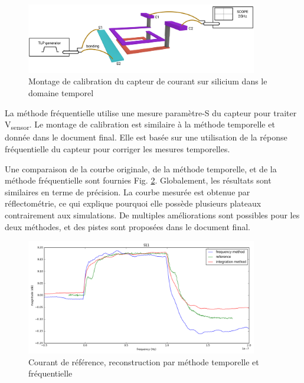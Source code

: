 \begin{figure}[!h]
  \centering
  \includegraphics[width=0.9\textwidth]{src/1/figures/sensor_measurement_setup.pdf}
  \caption{Montage de calibration du capteur de courant sur silicium dans le domaine temporel}
  \label{fig:calibration-sensor}
\end{figure}

La méthode fréquentielle utilise une mesure paramètre-S du capteur pour traiter V\textsubscript{sensor}.
Le montage de calibration est similaire à la méthode temporelle et donnée dans le document final.
Elle est basée sur une utilisation de la réponse fréquentielle du capteur pour corriger les mesures temporelles.

Une comparaison de la courbe originale, de la méthode temporelle, et de la méthode fréquentielle sont fournies Fig. \ref{fig:freq-domain-reconstructed}.
Globalement, les résultats sont similaires en terme de précision.
La courbe mesurée est obtenue par réflectométrie, ce qui explique pourquoi elle possède plusieurs plateaux contrairement aux simulations.
De multiples améliorations sont possibles pour les deux méthodes, et des pistes sont proposées dans le document final.

\begin{figure}[!h]
  \centering
  \includegraphics[width=0.9\textwidth]{src/1/figures/final_comparison_reconstructions.png}
  \caption{Courant de référence, reconstruction par méthode temporelle et fréquentielle}
  \label{fig:freq-domain-reconstructed}
\end{figure}

